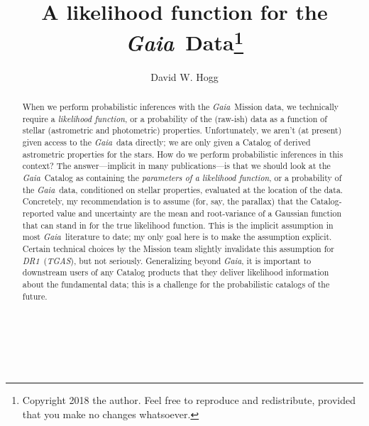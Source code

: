\documentclass[12pt, modern]{aastex62h}
\newcommand{\acronym}[1]{{\small{#1}}}
\newcommand{\Gaia}{\textsl{Gaia}}
\newcommand{\DRone}{\textsl{\acronym{DR1}}}
\newcommand{\TGAS}{\textsl{\acronym{TGAS}}}
\begin{document}
\sloppy\sloppypar\raggedbottom\frenchspacing

\noindent
\title{A likelihood function for the \Gaia\ Data\footnote{%
  Copyright 2018 the author. Feel free to reproduce and redistribute, provided
  that you make no changes whatsoever.}}

\author[0000-0003-2866-9403]{David W. Hogg}

\begin{abstract}\noindent
When we perform probabilistic inferences with the \Gaia\ Mission data,
we technically require
a \emph{likelihood function}, or a probability of the (raw-ish) data as a function
of stellar (astrometric and photometric) properties.
Unfortunately, we aren't (at present) given access to the \Gaia\ data
directly;
we are only given a Catalog of derived astrometric properties for the stars.
How do we perform probabilistic inferences in this context?
The answer---implicit in many publications---is that we should look at the
\Gaia\ Catalog as containing the \emph{parameters of a likelihood function}, or
a probability of the \Gaia\ data, conditioned on stellar properties,
evaluated at the location of the data.
Concretely, my recommendation is to assume
(for, say, the parallax) that the Catalog-reported
value and uncertainty are the mean and root-variance of a Gaussian
function that can stand in for the true likelihood function.
This is the implicit assumption in most \Gaia\ literature to date;
my only goal here is to make the assumption explicit.
Certain technical choices by the Mission team slightly invalidate
this assumption for \DRone\ (\TGAS), but not seriously. Generalizing beyond \Gaia,
it is important to downstream users of any Catalog products
that they deliver likelihood information about the fundamental data;
this is a challenge for the probabilistic catalogs of the future.
\end{abstract}


\section*{~}\clearpage
\end{document}

